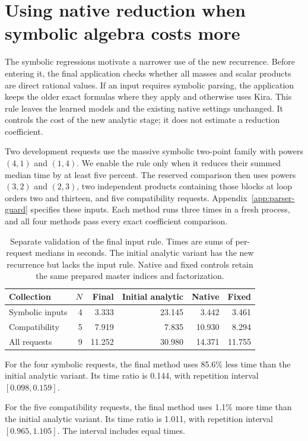 \section{Using native reduction when symbolic algebra costs more}
\label{sec:parser-guard}
The symbolic regressions motivate a narrower use of the new recurrence. Before entering it, the final application checks whether all masses and scalar products are direct rational values. If an input requires symbolic parsing, the application keeps the older exact formulas where they apply and otherwise uses Kira. This rule leaves the learned models and the existing native settings unchanged. It controls the cost of the new analytic stage; it does not estimate a reduction coefficient.

Two development requests use the massive symbolic two-point family with powers $(4,1)$ and $(1,4)$. We enable the rule only when it reduces their summed median time by at least five percent. The reserved comparison then uses powers $(3,2)$ and $(2,3)$, two independent products containing those blocks at loop orders two and thirteen, and five compatibility requests. Appendix~\ref{app:parser-guard} specifies these inputs. Each method runs three times in a fresh process, and all four methods pass every exact coefficient comparison.

\begin{table}[!htbp]\centering\small
\caption{Separate validation of the final input rule. Times are sums of per-request medians in seconds. The initial analytic variant has the new recurrence but lacks the input rule. Native and fixed controls retain the same prepared master indices and factorization.}
\label{tab:parser-guard}
\begin{tabular}{@{}lrrrrr@{}}\toprule
Collection & $N$ & Final & Initial analytic & Native & Fixed\\\midrule
Symbolic inputs & 4 & 3.333 & 23.145 & 3.442 & 3.461 \\
Compatibility & 5 & 7.919 & 7.835 & 10.930 & 8.294 \\
All requests & 9 & 11.252 & 30.980 & 14.371 & 11.755 \\
\bottomrule\end{tabular}\end{table}

For the four symbolic requests, the final method uses 85.6\% less time than the initial analytic variant. Its time ratio is 0.144, with repetition interval $[0.098,0.159]$.

For the five compatibility requests, the final method uses 1.1\% more time than the initial analytic variant. Its time ratio is 1.011, with repetition interval $[0.965,1.105]$. The interval includes equal times.


